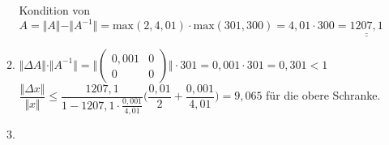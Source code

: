 \documentclass[a4paper,10pt]{article}
\begin{document}
\begin{enumerate}[a)]
\begin{enumerate}[b1)]
			Kondition von $A = \Vert A \Vert - \Vert A^{-1} \Vert = \mathrm{max}(2, 4,01) \cdot \mathrm{max}(301, 300) = 4,01 \cdot 300 = \underline{\underline{1207,1}}$
			\item
			$\Vert \varDelta A \Vert \cdot \Vert A^{-1} \Vert = \Big \Vert
			\begin{pmatrix}
			0,001 & 0\\
			0 & 0
			\end{pmatrix}
			\Big \Vert  \cdot 301 = 0,001 \cdot 301 = 0,301 < 1$\\
			
			$\dfrac{\Vert \varDelta x \Vert}{\Vert x \Vert} \leq \dfrac{1207,1}{1 - 1207,1 \cdot \frac{0,001}{4,01}} \Big (\dfrac{0,01}{2} + \dfrac{0,001}{4,01} \Bigg) = 9,065$ für die obere Schranke.
			\item \ \\
			

\end{enumerate}
\end{enumerate}
\end{document}
